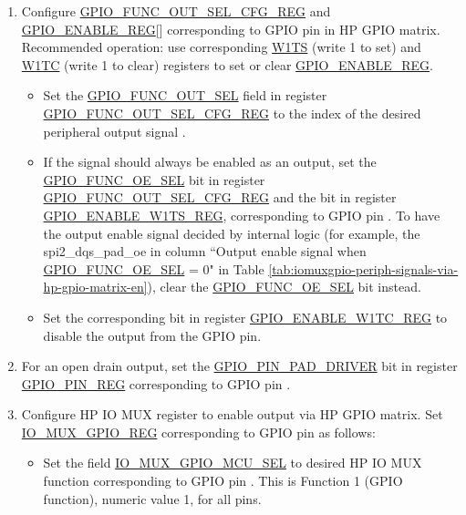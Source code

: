 \documentclass[main\_\_EN.tex]{subfiles}
\begin{document}
\begin{enumerate}
    \item Configure \hyperref[regdesc:GPIOFUNCNOUTSELCFGREG]{GPIO\_FUNC\_OUT\_SEL\_CFG\_REG} and  \hyperref[regdesc:GPIOENABLEREG]{GPIO\_ENABLE\_REG}[] corresponding to GPIO pin  in HP GPIO matrix. Recommended operation: use corresponding \hyperref[regdesc:GPIOENABLEW1TSREG]{W1TS} (write 1 to set) and \hyperref[regdesc:GPIOENABLEW1TCREG]{W1TC} (write 1 to clear) registers to set or clear \hyperref[regdesc:GPIOENABLEREG]{GPIO\_ENABLE\_REG}.


    \begin{itemize}
        \item Set the \hyperref[fielddesc:GPIOFUNCNOUTSEL]{GPIO\_FUNC\_OUT\_SEL} field in register \hyperref[regdesc:GPIOFUNCNOUTSELCFGREG]{GPIO\_FUNC\_OUT\_SEL\_CFG\_REG} to the index of the desired peripheral output signal .
        \item If the signal should always be enabled as an output, set the \hyperref[fielddesc:GPIOFUNCNOESEL]{GPIO\_FUNC\_OE\_SEL} bit in register \hyperref[regdesc:GPIOFUNCNOUTSELCFGREG]{GPIO\_FUNC\_OUT\_SEL\_CFG\_REG} and the bit in register \hyperref[regdesc:GPIOENABLEW1TSREG]{GPIO\_ENABLE\_W1TS\_REG}, corresponding to GPIO pin . To have the output enable signal decided by internal logic (for example, the spi2\_dqs\_pad\_oe in column ``Output enable signal when \hyperref[fielddesc:GPIOFUNCNOESEL]{GPIO\_FUNC\_OE\_SEL} = 0" in Table \ref{tab:iomuxgpio-periph-signals-via-hp-gpio-matrix-en}), clear the \hyperref[fielddesc:GPIOFUNCNOESEL]{GPIO\_FUNC\_OE\_SEL} bit instead.
       \item Set the corresponding bit in register \hyperref[regdesc:GPIOENABLEW1TCREG]{GPIO\_ENABLE\_W1TC\_REG} to disable the output from the GPIO pin.
    \end{itemize}
    \item For an open drain output, set the \hyperref[fielddesc:GPIOPINNPADDRIVER]{GPIO\_PIN\_PAD\_DRIVER} bit in register \hyperref[regdesc:GPIOPINNREG]{GPIO\_PIN\_REG} corresponding to GPIO pin .
    \item Configure HP IO MUX register to enable output via HP GPIO matrix. Set \hyperref[regdesc:IOMUXGPIONREG]{IO\_MUX\_GPIO\_REG} corresponding to GPIO pin  as follows:
    \begin{itemize}
        \item Set the field \hyperref[fielddesc:IOMUXGPIONMCUSEL]{IO\_MUX\_GPIO\_MCU\_SEL} to desired HP IO MUX function corresponding to GPIO pin . This is Function 1 (GPIO function), numeric value 1, for all pins.

\end{itemize}
\end{enumerate}
\end{document}
